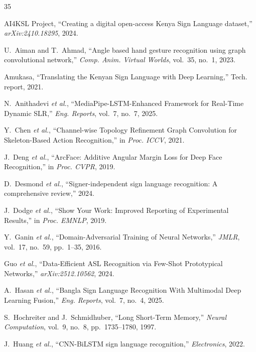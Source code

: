 \documentclass[conference]{IEEEtran}
\begin{document}

\begin{thebibliography}{35}

AI4KSL Project, ``Creating a digital open-access Kenya Sign Language dataset,'' \textit{arXiv:2410.18295}, 2024.

U.~Aiman and T.~Ahmad, ``Angle based hand gesture recognition using graph convolutional network,'' \textit{Comp. Anim. Virtual Worlds}, vol.~35, no.~1, 2023.

Amukasa, ``Translating the Kenyan Sign Language with Deep Learning,'' Tech. report, 2021.

N.~Anithadevi \textit{et al.}, ``MediaPipe-LSTM-Enhanced Framework for Real-Time Dynamic SLR,'' \textit{Eng. Reports}, vol.~7, no.~7, 2025.

Y.~Chen \textit{et al.}, ``Channel-wise Topology Refinement Graph Convolution for Skeleton-Based Action Recognition,'' in \textit{Proc. ICCV}, 2021.

J.~Deng \textit{et al.}, ``ArcFace: Additive Angular Margin Loss for Deep Face Recognition,'' in \textit{Proc. CVPR}, 2019.

D.~Desmond \textit{et al.}, ``Signer-independent sign language recognition: A comprehensive review,'' 2024.

J.~Dodge \textit{et al.}, ``Show Your Work: Improved Reporting of Experimental Results,'' in \textit{Proc. EMNLP}, 2019.

Y.~Ganin \textit{et al.}, ``Domain-Adversarial Training of Neural Networks,'' \textit{JMLR}, vol.~17, no.~59, pp.~1--35, 2016.

Guo \textit{et al.}, ``Data-Efficient ASL Recognition via Few-Shot Prototypical Networks,'' \textit{arXiv:2512.10562}, 2024.

A.~Hasan \textit{et al.}, ``Bangla Sign Language Recognition With Multimodal Deep Learning Fusion,'' \textit{Eng. Reports}, vol.~7, no.~4, 2025.

S.~Hochreiter and J.~Schmidhuber, ``Long Short-Term Memory,'' \textit{Neural Computation}, vol.~9, no.~8, pp.~1735--1780, 1997.

J.~Huang \textit{et al.}, ``CNN-BiLSTM sign language recognition,'' \textit{Electronics}, 2022.


\end{thebibliography}
\end{document}
